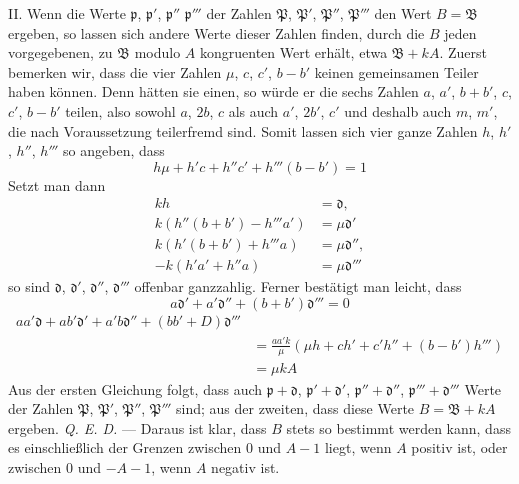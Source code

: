 II. Wenn die Werte $\mathfrak{p}$, $\mathfrak{p}'$, $\mathfrak{p}''$ $\mathfrak{p}'''$ der Zahlen $\mathfrak{P}$, $\mathfrak{P}'$, $\mathfrak{P}''$, $\mathfrak{P}'''$ den Wert $B=\mathfrak{B}$ ergeben, so lassen sich andere Werte dieser Zahlen finden, durch die $B$ jeden vorgegebenen, zu $\mathfrak{B}$ modulo $A$ kongruenten Wert erhält, etwa $\mathfrak{B}+kA$. Zuerst bemerken wir, dass die vier Zahlen $\mu$, $c$, $c'$, $b-b'$ keinen gemeinsamen Teiler haben können. Denn hätten sie einen, so würde er die sechs Zahlen $a$, $a'$, $b+b'$, $c$, $c'$, $b-b'$ teilen, also sowohl $a$, $2b$, $c$ als auch $a'$, $2b'$, $c'$ und deshalb auch $m$, $m'$, die nach Voraussetzung teilerfremd sind. Somit lassen sich vier ganze Zahlen $h$, $h'$, $h''$, $h'''$ so angeben, dass
\[
h\mu+h'c+h''c'+h'''(b-b')=1
\]
Setzt man dann
\[
\begin{aligned}
kh&=\mathfrak{d},\\k(h''(b+b')-h'''a')&=\mu\mathfrak{d}'\\
k(h'(b+b')+h'''a)&=\mu\mathfrak{d}'',\\-k(h'a'+h''a)&=\mu\mathfrak{d}'''
\end{aligned}
\]
so sind $\mathfrak{d}$, $\mathfrak{d}'$, $\mathfrak{d}''$, $\mathfrak{d}'''$ offenbar ganzzahlig. Ferner bestätigt man leicht, dass
\[
a\mathfrak{d}'+a'\mathfrak{d}''+(b+b')\mathfrak{d}'''=0
\]
\[
\begin{aligned}aa'\mathfrak{d}+ab'\mathfrak{d}'+a'b\mathfrak{d}''+(bb'+D)\mathfrak{d}'''\\&=\frac{aa'k}{\mu}(\mu h+ch'+c'h''+(b-b')h''')\\&=\mu kA\end{aligned}
\]
Aus der ersten Gleichung folgt, dass auch $\mathfrak{p}+\mathfrak{d}$, $\mathfrak{p}'+\mathfrak{d}'$, $\mathfrak{p}''+\mathfrak{d}''$, $\mathfrak{p}'''+\mathfrak{d}'''$ Werte der Zahlen $\mathfrak{P}$, $\mathfrak{P}'$, $\mathfrak{P}''$, $\mathfrak{P}'''$ sind; aus der zweiten, dass diese Werte $B=\mathfrak{B}+kA$ ergeben. \textit{Q. E. D.} ---
Daraus ist klar, dass $B$ stets so bestimmt werden kann, dass es einschließlich der Grenzen zwischen $0$ und $A-1$ liegt, wenn $A$ positiv ist, oder zwischen $0$ und $-A-1$, wenn $A$ negativ ist.

